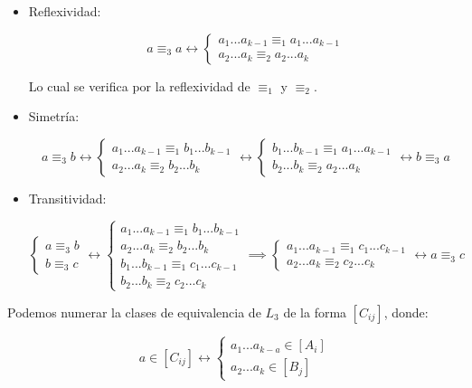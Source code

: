 \documentclass[11pt,a4paper]{article}
\begin{document}
\begin{itemize}
\item Reflexividad:

$$ a \equiv_3 a \leftrightarrow \begin{cases} a_1...a_{k-1} \equiv_1 a_1...a_{k-1} \\ a_2...a_k \equiv_2 a_2...a_k \end{cases} $$

Lo cual se verifica por la reflexividad de $\equiv_1$ y $\equiv_2$.

\item Simetría:

$$ a \equiv_3 b \leftrightarrow \begin{cases} a_1...a_{k-1} \equiv_1 b_1...b_{k-1} \\ a_2...a_k \equiv_2 b_2...b_k \end{cases}  \leftrightarrow \begin{cases} b_1...b_{k-1} \equiv_1 a_1...a_{k-1} \\ b_2...b_k \equiv_2 a_2...a_k \end{cases} \leftrightarrow b \equiv_3 a$$

\item Transitividad:

$$ \begin{cases} a \equiv_3 b \\ b \equiv_3 c \end{cases} \leftrightarrow \begin{cases} a_1...a_{k-1} \equiv_1 b_1...b_{k-1} \\ a_2...a_k \equiv_2 b_2...b_k \\ b_1...b_{k-1} \equiv_1 c_1...c_{k-1} \\ b_2...b_k \equiv_2 c_2...c_k \end{cases}  \implies \begin{cases} a_1...a_{k-1} \equiv_1 c_1...c_{k-1} \\ a_2...a_k \equiv_2 c_2...c_k \end{cases} \leftrightarrow a \equiv_3 c$$

\end{itemize}

Podemos numerar la clases de equivalencia de $L_3$ de la forma $[C_{ij}]$, donde:

$$a \in [C_{ij}] \leftrightarrow \begin{cases} a_1...a_{k-a} \in [A_i] \\ a_2...a_k \in [B_j]\end{cases}$$
\end{document}
